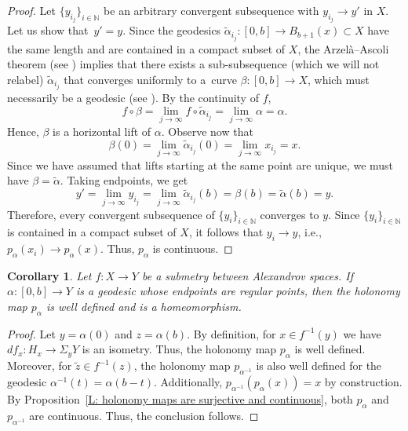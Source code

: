 \documentclass[10pt,a4paper]{amsart}
\numberwithin{equation}{section}
\newtheorem{cor}[thm]{Corollary}
\theoremstyle{definition}
\begin{document}
\begin{proof}
Let $\{y_{i_j}\}_{i\in\mathbb{N}}$ be an arbitrary convergent subsequence with $y_{i_j}\to y'$ in $X$. Let us show that~${y' = y}$. Since the geodesics $\tilde{\alpha}_{i_j}\colon [0,b]\to B_{b+1}(x)\subset X$ have the same length and are contained in a compact subset of $X$, the Arzel\`a--Ascoli theorem (see \cite[Theorem 2.5.14]{BuragoBuragoIvanov}) implies that there exists a sub-subsequence (which we will not relabel) $\tilde{\alpha}_{i_j}$ that converges uniformly to a~curve $\beta\colon [0,b]\to X$, which must necessarily be a geodesic (see \cite[Proposition 2.5.17]{BuragoBuragoIvanov}). By the continuity of $f$,
\[
f\circ \beta = \lim_{j\to \infty}f\circ \tilde{\alpha}_{i_j} = \lim_{j\to\infty}\alpha = \alpha.
\]
Hence, $\beta$ is a horizontal lift of $\alpha$. Observe now that
\[
\beta(0) = \lim_{j\to\infty}\tilde{\alpha}_{i_j}(0) = \lim_{j\to\infty} x_{i_j} = x.
\]
Since we have assumed that lifts starting at the same point are unique, we must have $\beta = \tilde{\alpha}$. Taking endpoints, we get
\[
y' = \lim_{j\to\infty}y_{i_j} = \lim_{j\to \infty}\tilde{\alpha}_{i_j}(b) = \beta(b) = \tilde{\alpha}(b) = y.
\]
Therefore, every convergent subsequence of $\{y_i\}_{i\in \mathbb{N}}$ converges to $y$. Since $\{y_i\}_{i\in \mathbb{N}}$ is contained in a compact subset of $X$, it follows that $y_i\to y$, i.e., $p_{\alpha}(x_i) \to p_\alpha(x)$. Thus, $p_\alpha$ is continuous.
\end{proof}






\begin{cor}\label{L: holonomy maps over regular leaves are homeomorphisms}
Let $f\colon X\to Y$ be a submetry between Alexandrov spaces. If $\alpha\colon [0,b]\to Y$ is a geodesic whose endpoints are regular points, then the holonomy map $p_\alpha$ is well defined and is a homeomorphism.
\end{cor}

\begin{proof}
Let $y = \alpha(0)$ and $z=\alpha(b)$. By definition, for $x\in f^{-1}(y)$ we have $df_x\colon H_x\to \Sigma_y Y$ is an isometry. Thus, the holonomy map $p_\alpha$ is well defined. Moreover, for $\tilde{z}\in f^{-1}(z)$, the holonomy map $p_{\alpha^{-1}}$ is also well defined for the geodesic $\alpha^{-1}(t)= \alpha(b-t)$. Additionally, $p_{\alpha^{-1}}(p_{\alpha}(x))=x$ by construction. By Proposition~\ref{L: holonomy maps are surjective and continuous}, both $p_\alpha$ and $p_{\alpha^{-1}}$ are continuous. Thus, the conclusion follows.
\end{proof}
\end{document}
